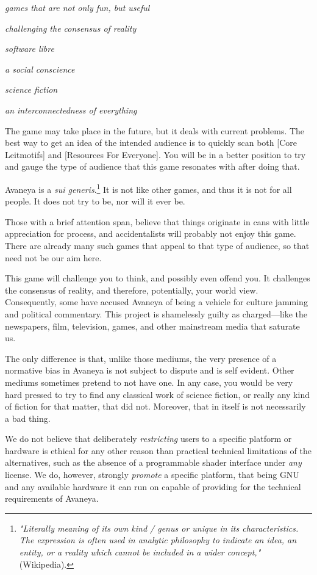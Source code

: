 \startitemize[3]
\item
{\it games that are not only fun, but useful}
\item
{\it challenging the consensus of reality}
\item
{\it software libre}
\item
{\it a social conscience}
\item
{\it science fiction}
\item
{\it an interconnectedness of everything}
\stopitemize

The game may take place in the future, but it deals with current problems. The best way to get an idea of the intended audience is to quickly scan both [Core Leitmotifs] and [Resources For Everyone]. You will be in a better position to try and gauge the type of audience that this game resonates with after doing that. 

Avaneya is a {\it sui generis}.\footnote{{\it "Literally meaning of its own kind / genus or unique in its characteristics. The expression is often used in analytic philosophy to indicate an idea, an entity, or a reality which cannot be included in a wider concept,"} (Wikipedia).} It is not like other games, and thus it is not for all people. It does not try to be, nor will it ever be.

Those with a brief attention span, believe that things originate in cans with little appreciation for process, and accidentalists will probably not enjoy this game. There are already many such games that appeal to that type of audience, so that need not be our aim here.

This game will challenge you to think, and possibly even offend you. It challenges the consensus of reality, and therefore, potentially, your world view. Consequently, some have accused Avaneya of being a vehicle for culture jamming and political commentary. This project is shamelessly guilty as charged---like the newspapers, film, television, games, and other mainstream media that saturate us. 

The only difference is that, unlike those mediums, the very presence of a normative bias in Avaneya is not subject to dispute and is self evident. Other mediums sometimes pretend to not have one. In any case, you would be very hard pressed to try to find any classical work of science fiction, or really any kind of fiction for that matter, that did not. Moreover, that in itself is not necessarily a bad thing.

We do not believe that deliberately {\it restricting} users to a specific platform or hardware is ethical for any other reason than practical technical limitations of the alternatives, such as the absence of a programmable shader interface under {\it any} license. We do, however, strongly {\it promote} a specific platform, that being GNU and any available hardware it can run on capable of providing for the technical requirements of Avaneya.

